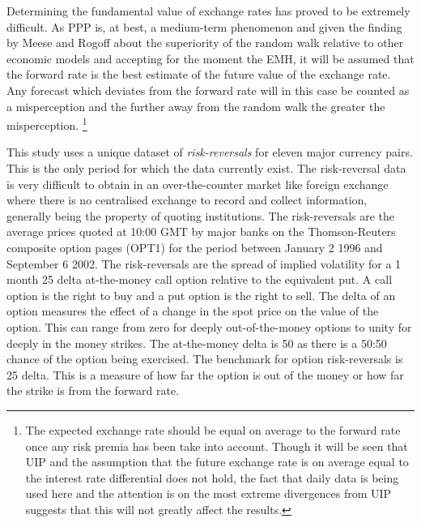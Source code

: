 \documentclass[12pt, a4paper, oneside]{article} %
\begin{document}
Determining the fundamental value of exchange rates has proved to be extremely difficult.  As PPP is, at best, a medium-term phenomenon and given the finding by Meese and Rogoff about the superiority of the random walk relative to other economic models and accepting for the moment the EMH, it will be assumed that the forward rate is the best estimate of the future value of the exchange rate.  Any forecast which deviates from the forward rate will in this case be counted as a misperception and the further away from the random walk the greater the misperception. \footnote{The expected  exchange rate should be equal on average to the forward rate once any risk premia has been take into account. Though it will be seen that UIP and the assumption that the future exchange rate is on average equal to the interest rate differential does not hold, the fact that daily data is being used here and the attention is on the most extreme divergences from UIP suggests that this will not greatly affect the results.}     

This study uses a unique dataset of \emph{risk-reversals} for eleven major currency pairs.  This is the only period for which the data currently exist.  The risk-reversal data is very difficult to obtain in an over-the-counter market like foreign exchange where there is no centralised exchange to record and collect information, generally being the property of quoting institutions.  The risk-reversals are the average prices quoted at 10:00 GMT by major banks on the Thomson-Reuters composite option pages (OPT1)  for the period between January 2 1996 and September 6 2002.  The risk-reversals are the spread of implied volatility for a 1 month 25 delta at-the-money call option relative to the equivalent put.  A call option is the right to buy and a put option is the right to sell.  The delta of an option measures the effect of a change in the spot price on the value of the option.  This can range from zero for deeply out-of-the-money options to unity for deeply in the money strikes.  The at-the-money delta is 50 as there is a 50:50 chance of the option being exercised.  The benchmark for option risk-reversals is 25 delta.  This is a measure of how far the option is out of the money or how far the strike is from the forward rate.  
\end{document}
